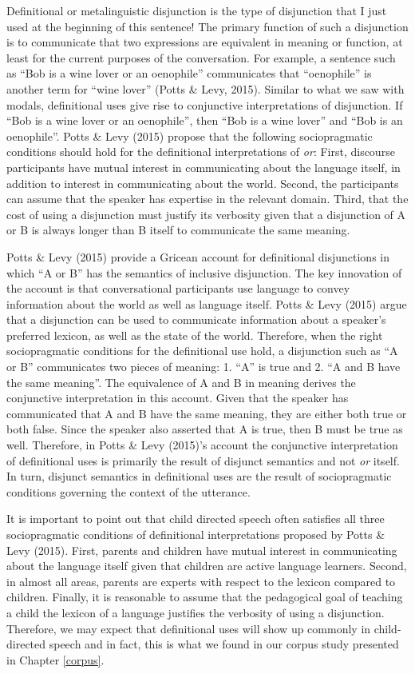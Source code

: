 \documentclass[oneside]{report}
\theoremstyle{definition}
\theoremstyle{definition}
\theoremstyle{definition}
\theoremstyle{remark}
\begin{document}
Definitional or metalinguistic disjunction is the type of disjunction
that I just used at the beginning of this sentence! The primary function
of such a disjunction is to communicate that two expressions are
equivalent in meaning or function, at least for the current purposes of
the conversation. For example, a sentence such as ``Bob is a wine lover
or an oenophile'' communicates that ``oenophile'' is another term for
``wine lover'' (Potts \& Levy, 2015). Similar to what we saw with
modals, definitional uses give rise to conjunctive interpretations of
disjunction. If ``Bob is a wine lover or an oenophile'', then ``Bob is a
wine lover'' and ``Bob is an oenophile''. Potts \& Levy (2015) propose
that the following sociopragmatic conditions should hold for the
definitional interpretations of \emph{or}: First, discourse participants
have mutual interest in communicating about the language itself, in
addition to interest in communicating about the world. Second, the
participants can assume that the speaker has expertise in the relevant
domain. Third, that the cost of using a disjunction must justify its
verbosity given that a disjunction of A or B is always longer than B
itself to communicate the same meaning.

Potts \& Levy (2015) provide a Gricean account for definitional
disjunctions in which ``A or B'' has the semantics of inclusive
disjunction. The key innovation of the account is that conversational
participants use language to convey information about the world as well
as language itself. Potts \& Levy (2015) argue that a disjunction can be
used to communicate information about a speaker's preferred lexicon, as
well as the state of the world. Therefore, when the right sociopragmatic
conditions for the definitional use hold, a disjunction such as ``A or
B'' communicates two pieces of meaning: 1. ``A'' is true and 2. ``A and
B have the same meaning''. The equivalence of A and B in meaning derives
the conjunctive interpretation in this account. Given that the speaker
has communicated that A and B have the same meaning, they are either
both true or both false. Since the speaker also asserted that A is true,
then B must be true as well. Therefore, in Potts \& Levy (2015)'s
account the conjunctive interpretation of definitional uses is primarily
the result of disjunct semantics and not \emph{or} itself. In turn,
disjunct semantics in definitional uses are the result of sociopragmatic
conditions governing the context of the utterance.

It is important to point out that child directed speech often satisfies
all three sociopragmatic conditions of definitional interpretations
proposed by Potts \& Levy (2015). First, parents and children have
mutual interest in communicating about the language itself given that
children are active language learners. Second, in almost all areas,
parents are experts with respect to the lexicon compared to children.
Finally, it is reasonable to assume that the pedagogical goal of
teaching a child the lexicon of a language justifies the verbosity of
using a disjunction. Therefore, we may expect that definitional uses
will show up commonly in child-directed speech and in fact, this is what
we found in our corpus study presented in Chapter \ref{corpus}.
\end{document}
